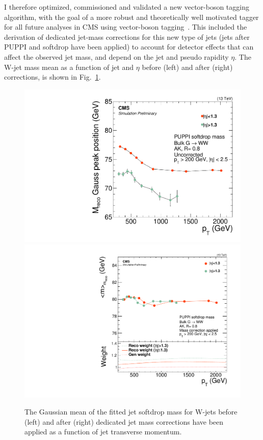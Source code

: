 \documentclass{pasa}%
\begin{document}
I therefore optimized, commissioned and validated a new vector-boson tagging algorithm, with the goal of a more robust and theoretically well motivated tagger for all future analyses in CMS using vector-boson tagging~\cite{CMS-PAS-JME-16-003}. This included the derivation of dedicated jet-mass corrections for this new type of jets (jets after PUPPI and softdrop have been applied) to account for detector effects that can affect the observed jet mass, and depend on the jet \PT and pseudo rapidity $\eta$. The W-jet mass mean as a function of jet \PT and $\eta$ before (left) and after (right) corrections, is shown in Fig.~\ref{Fig3}.
\begin{figure}[h!]
\centering
 \includegraphics[width=0.49\columnwidth]{figures/RecoPuppiSoftdropMass_vspt.pdf}
  \includegraphics[width=0.49\columnwidth]{figures//ClosureTest_RecoMass.pdf}
\caption{The Gaussian mean of the fitted jet softdrop mass for W-jets before (left) and after (right) dedicated jet mass corrections have been applied as a function of jet transverse momentum. }
\label{Fig3}
\end{figure}
\end{document}
